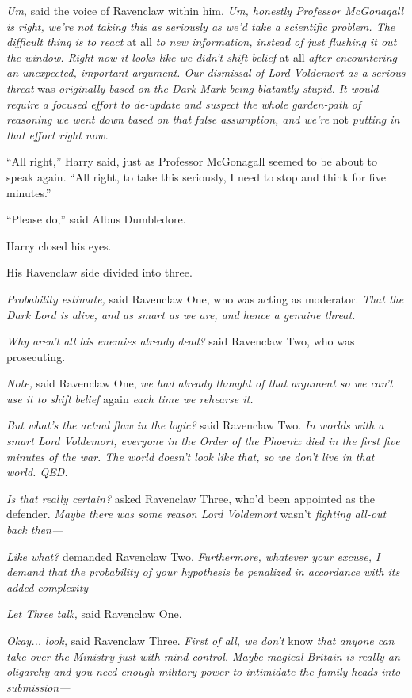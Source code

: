 \emph{Um,} said the voice of Ravenclaw within him. \emph{Um, honestly Professor McGonagall is right, we’re not taking this as seriously as we’d take a scientific problem. The difficult thing is to react} at all \emph{to new information, instead of just flushing it out the window. Right now it looks like we didn’t shift belief} at all \emph{after encountering an unexpected, important argument. Our dismissal of Lord Voldemort as a serious threat} was \emph{originally based on the Dark Mark being blatantly stupid. It would require a focused effort to de-update and suspect the whole garden-path of reasoning we went down based on that false assumption, and we’re} not \emph{putting in that effort right now.}

“All right,” Harry said, just as Professor McGonagall seemed to be about to speak again. “All right, to take this seriously, I need to stop and think for five minutes.”

“Please do,” said Albus Dumbledore.

Harry closed his eyes.

His Ravenclaw side divided into three.

\emph{Probability estimate,} said Ravenclaw One, who was acting as moderator. \emph{That the Dark Lord is alive, and as smart as we are, and hence a genuine threat.}

\emph{Why aren’t all his enemies already dead?} said Ravenclaw Two, who was prosecuting.

\emph{Note,} said Ravenclaw One, \emph{we had already thought of that argument so we can’t use it to shift belief} again \emph{each time we rehearse it.}

\emph{But what’s the actual flaw in the logic?} said Ravenclaw Two. \emph{In worlds with a smart Lord Voldemort, everyone in the Order of the Phoenix died in the first five minutes of the war. The world doesn’t look like that, so we don’t live in that world. QED.}

\emph{Is that really certain?} asked Ravenclaw Three, who’d been appointed as the defender. \emph{Maybe there was some reason Lord Voldemort} wasn’t \emph{fighting all-out back then—}

\emph{Like what?} demanded Ravenclaw Two. \emph{Furthermore, whatever your excuse, I demand that the probability of your hypothesis be penalized in accordance with its added complexity—}

\emph{Let Three talk,} said Ravenclaw One.

\emph{Okay... look,} said Ravenclaw Three. \emph{First of all, we don’t} know \emph{that anyone can take over the Ministry just with mind control. Maybe magical Britain is really an oligarchy and you need enough military power to intimidate the family heads into submission—}

